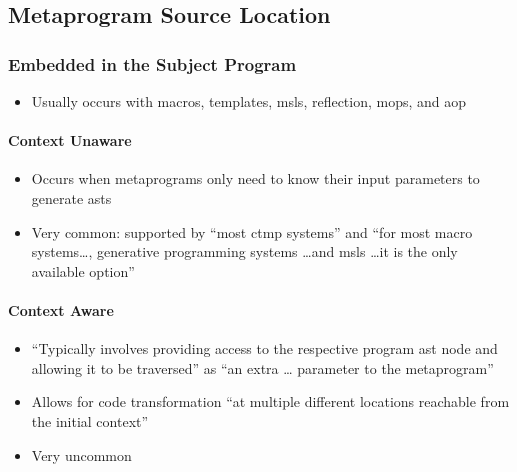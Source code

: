 \subsection{Metaprogram Source Location}
\subsubsection{Embedded in the Subject Program \cite[p.~113:25-26]{lilis_survey_2019}}
\begin{itemize}
      \item Usually occurs with macros, templates, \acsp{msl}, reflection,
            \acsp{mop}, and \acs{aop} \cite[p.~113:25]{lilis_survey_2019}
\end{itemize}

\paragraph{Context Unaware \cite[p.~113:25]{lilis_survey_2019}}
\begin{itemize}
      \item Occurs when metaprograms only need to know their input parameters
            to generate \acsp{ast} \cite[p.~113:25]{lilis_survey_2019}
      \item Very common: supported by ``most \acs{ctmp} systems''
            \cite[p.~113:31]{lilis_survey_2019} and ``for most macro
            systems\dots, generative programming systems \dots and \acsp{msl}
            \dots it is the only available option'' \cite[p.~113:25]{lilis_survey_2019}
\end{itemize}

\paragraph{Context Aware \cite[p.~113:25-26]{lilis_survey_2019}}
\begin{itemize}
      \item ``Typically involves providing access to the respective program
            \acs{ast} node and allowing it to be traversed'' as ``an extra \dots
            parameter to the metaprogram'' \cite[p.~113:25]{lilis_survey_2019}
      \item Allows for code transformation ``at multiple different locations
            reachable from the initial context'' \cite[p.~113:25]{lilis_survey_2019}
      \item Very uncommon \cite[p.~113:25,~31]{lilis_survey_2019}
\end{itemize}

